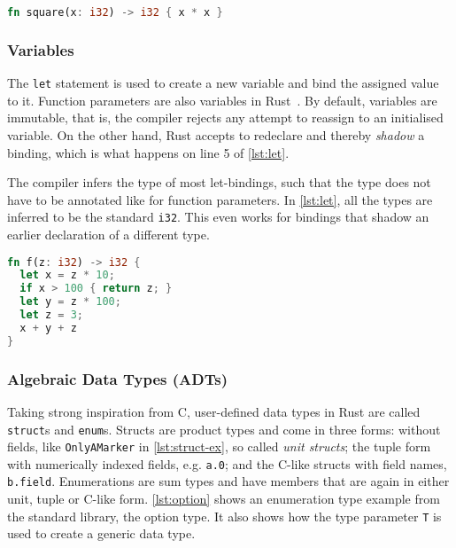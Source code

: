 \begin{lstlisting}[style=short, language=Rust, caption={A simple Rust function.}, label=lst:first-ex]
fn square(x: i32) -> i32 { x * x }
\end{lstlisting}

\subsubsection{Variables}

The \lstinline!let! statement is used to create a new variable and bind the
assigned value to it. Function parameters are also variables in
Rust~\cite{rustref}. By default, variables are immutable, that is, the compiler
rejects any attempt to reassign to an initialised variable. On the other hand,
Rust accepts to redeclare and thereby \emph{shadow} a binding, which is what
happens on line 5 of \autoref{lst:let}.

The compiler infers the type of most let-bindings, such that the type does not
have to be annotated like for function parameters. In \autoref{lst:let}, all the
types are inferred to be the standard \lstinline!i32!. This even works for
bindings that shadow an earlier declaration of a different type.

\begin{lstlisting}[language=Rust, caption={A Rust function doing some arithmetics.}, label=lst:let]
fn f(z: i32) -> i32 {
  let x = z * 10;
  if x > 100 { return z; }
  let y = z * 100;
  let z = 3;
  x + y + z
}
\end{lstlisting}

\subsubsection{Algebraic Data Types (ADTs)}

Taking strong inspiration from C, user-defined data types in Rust are called
\lstinline!struct!s and \lstinline!enum!s. Structs are product types and come in
three forms: without fields, like \lstinline!OnlyAMarker! in
\autoref{lst:struct-ex}, so called \emph{unit structs}; the tuple form with
numerically indexed fields, e.g. \lstinline!a.0!; and the C-like structs with
field names, \lstinline!b.field!. Enumerations are sum types and have members
that are again in either unit, tuple or C-like form. \autoref{lst:option} shows
an enumeration type example from the standard library, the option type. It also shows
how the type parameter \lstinline!T! is used to create a generic data type.

